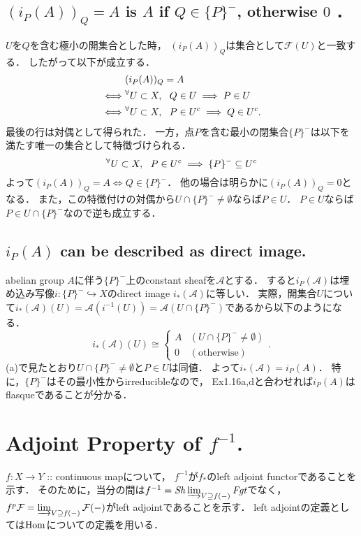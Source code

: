 \documentclass[a4paper]{jsarticle}
\newcommand{\shA}{\mathcal{A}}
\newcommand{\shF}{\mathcal{F}}
\newcommand{\ftorSh}{\mathit{Sh}}
\newcommand{\ftorFgt}{\mathit{Fgt}}
\begin{document}
    \subsection{$(i_P(A))_Q=A$ is $A$ if $Q \in \{P\}^-$, otherwise $0$ ．}
    $U$を$Q$を含む極小の開集合とした時，
    $(i_P(A))_Q$は集合として$\shF(U)$と一致する．
    したがって以下が成立する．
    \begin{align*}
        {}& (i_P(A))_Q=A \\
        \iff& {}^{\forall} U \subset X,~~ Q \in U \implies P \in U \\
        \iff& {}^{\forall} U \subset X,~~ P \in U^c \implies Q \in U^c.
    \end{align*}
    最後の行は対偶として得られた．
    一方，点$P$を含む最小の閉集合$\{P\}^-$は以下を満たす唯一の集合として特徴づけられる．
    \[ {}^{\forall} U \subset X,~~ P \in U^c \implies \{P\}^- \subseteq U^c \]
    よって$(i_P(A))_Q=A \iff Q \in \{P\}^-$．
    他の場合は明らかに$(i_P(A))_Q=0$となる．
    また，この特徴付けの対偶から$U \cap \{P\}^- \neq \emptyset$ならば$P \in U$．
    $P \in U$ならば$P \in U \cap \{P\}^-$なので逆も成立する．

    \subsection{$i_P(A)$ can be described as direct image.}
    abelian group $A$に伴う$\{P\}^-$上のconstant sheafを$\shA$とする．
    すると$i_P(\shA)$は埋め込み写像$i: \{P\}^- \hookrightarrow X$のdirect image $i_*(\shA)$に等しい．
    実際，開集合$U$について$i_*(\shA)(U)=\shA(i^{-1}(U))=\shA(U \cap \{P\}^-)$であるから以下のようになる．
    \[
        i_*(\shA)(U) \cong
        \begin{cases}{}
            A & (U \cap \{P\}^- \neq \emptyset) \\
            0 & (\text{otherwise})
        \end{cases}.
    \]
    (a)で見たとおり$U \cap \{P\}^- \neq \emptyset$と$P \in U$は同値．
    よって$i_*(\shA)=i_P(A)$．
    特に，$\{P\}^-$はその最小性からirreducibleなので，
    Ex1.16a,dと合わせれば$i_P(A)$はflasqueであることが分かる．

\section{Adjoint Property of $f^{-1}$.} %
    $f: X \to Y$ :: continuous mapについて，
    $f^{-1}$が$f_*$のleft adjoint functorであることを示す．
    そのために，当分の間は$f^{-1}=\ftorSh \varinjlim_{V \supseteq f(-)} \ftorFgt$でなく，
    $f^p\shF=\varinjlim_{V \supseteq f(-)} \shF(-)$がleft adjointであることを示す．
    left adjointの定義としては$\operatorname{Hom}$についての定義を用いる．
\end{document}

